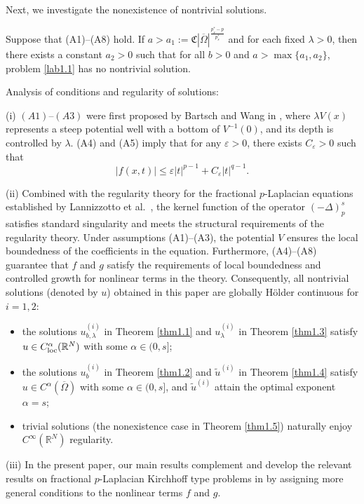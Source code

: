 \documentclass[reqno]{amsart}
\begin{document}
Next, we investigate the nonexistence of nontrivial solutions.

\begin{theorem} \label{thm1.5}
Suppose that {\rm (A1)--(A8)}  hold.
If $a>a_1:=\mathfrak{C}|\overline{\Omega}|^{\frac{p^*_s-p}{p^*_s}}$ and for each 
fixed $\lambda>0$, then there exists a constant $a_2>0$ such that for all $b>0$ and 
$a>\max\{a_1, a_2\}$, problem \eqref{lab1.1} has no nontrivial solution.
\end{theorem}

\begin{remark}  \label{rmk1.6} \rm
Analysis of conditions and regularity of solutions:

(i) $(A1)$--$(A3)$ were first proposed by Bartsch and Wang in \cite{r2},
where $\lambda V(x)$ represents a steep potential well with a bottom of $V^{-1}(0)$, 
and its depth is controlled by $\lambda$.  (A4) and (A5) imply that for any
$\varepsilon> 0$, there exists $C_\varepsilon > 0$ such that
\begin{equation}\label{lab1.6}
|f(x,t)|\leq \varepsilon|t|^{p-1}+C_\varepsilon|t|^{q-1}.
\end{equation}

(ii) Combined with the regularity theory for the fractional $p$-Laplacian equations 
established by Lannizzotto et al.\ \cite{r11, r12}, the kernel function of the operator 
$(-\Delta)_p^s$ satisfies standard singularity and meets the structural requirements 
of the regularity theory. Under assumptions (A1)--(A3), the potential
$V$ ensures the local boundedness of the coefficients in the equation. 
Furthermore, (A4)--(A8) guarantee that $f$ and $g$ satisfy the requirements of
local boundedness and controlled growth for nonlinear terms in the theory. 
Consequently, all nontrivial solutions (denoted by $u$) obtained in this paper are 
globally H\"{o}lder continuous for $i=1,2$:
\begin{itemize}
\item the solutions $u_{b,\lambda}^{(i)}$ in Theorem \ref{thm1.1} and 
 $u_{\lambda}^{(i)}$ in Theorem \ref{thm1.3} satisfy 
 $u\in C^{\alpha}_{\rm loc}(\mathbb{R}^N)$ with some $\alpha\in(0, s]$;
 
\item the solutions $u_{b}^{(i)}$ in Theorem \ref{thm1.2} and $\widetilde{u}^{(i)}$ 
 in Theorem \ref{thm1.4} satisfy $u\in C^{\alpha}(\overline{\Omega})$ with some 
 $\alpha\in(0, s]$, and $\widetilde{u}^{(i)}$ attain the optimal exponent $\alpha=s$;

\item trivial solutions (the nonexistence case in Theorem \ref{thm1.5}) naturally 
enjoy $C^\infty(\mathbb{R}^N)$ regularity.
\end{itemize}

(iii) In the present paper, our main results complement and develop the relevant 
results on fractional $p$-Laplacian Kirchhoff type problems in \cite{r19, r26, r31, r33} 
by assigning more general conditions to the nonlinear terms $f$ and $g$.
\end{remark}
\end{document}
